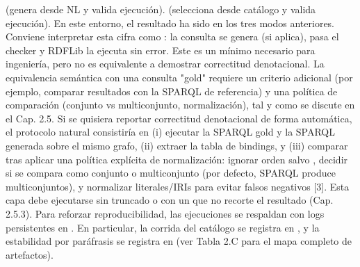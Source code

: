 \markdownRendererUlItem {} (genera desde NL y valida ejecución).\markdownRendererUlItemEnd 
\markdownRendererUlItem {} (selecciona desde catálogo y valida ejecución).\markdownRendererUlItemEnd 
\markdownRendererUlEndTight \markdownRendererInterblockSeparator
{}En este entorno, el resultado ha sido  en los tres modos anteriores.\markdownRendererInterblockSeparator
{}Conviene interpretar esta cifra como : la consulta se genera (si aplica), pasa el checker y RDFLib la ejecuta sin error. Este es un mínimo necesario para ingeniería, pero no es equivalente a demostrar correctitud denotacional. La equivalencia semántica con una consulta "gold" requiere un criterio adicional (por ejemplo, comparar resultados con la SPARQL de referencia) y una política de comparación (conjunto vs multiconjunto, normalización), tal y como se discute en el Cap. 2.5.\markdownRendererInterblockSeparator
{} Si se quisiera reportar correctitud denotacional de forma automática, el protocolo natural consistiría en (i) ejecutar la SPARQL gold y la SPARQL generada sobre el mismo grafo, (ii) extraer la tabla de bindings, y (iii) comparar tras aplicar una política explícita de normalización: ignorar orden salvo , decidir si se compara como conjunto o multiconjunto (por defecto, SPARQL produce multiconjuntos), y normalizar literales/IRIs para evitar falsos negativos [3]. Esta capa debe ejecutarse sin truncado o con un  que no recorte el resultado (Cap. 2.5.3).\markdownRendererInterblockSeparator
{}Para reforzar reproducibilidad, las ejecuciones se respaldan con logs persistentes en . En particular, la corrida del catálogo se registra en , y la estabilidad por paráfrasis se registra en  (ver Tabla 2.C para el mapa completo de artefactos).\markdownRendererInterblockSeparator
